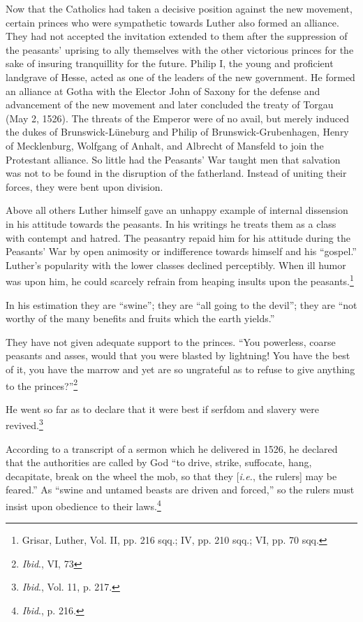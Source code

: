 Now that the Catholics had taken a decisive position against the
new movement, certain princes who were sympathetic towards
Luther also formed an alliance. They had not accepted the invitation
extended to them after the suppression of the peasants’ uprising to
ally themselves with the other victorious princes for the sake of insuring
tranquillity for the future. Philip I, the young and proficient
landgrave of Hesse, acted as one of the leaders of the new government.
He formed an alliance at Gotha with the Elector John of
Saxony for the defense and advancement of the new movement and
later concluded the treaty of Torgau (May 2, 1526). The threats of
the Emperor were of no avail, but merely induced the dukes of
Brunswick-Lüneburg and Philip of Brunswick-Grubenhagen, Henry
of Mecklenburg, Wolfgang of Anhalt, and Albrecht of Mansfeld to
join the Protestant alliance. So little had the Peasants’ War taught
men that salvation was not to be found in the disruption of the
fatherland. Instead of uniting their forces, they were bent upon
division.

Above all others Luther himself gave an unhappy example of internal dissension
in his attitude towards the peasants. In his writings
he treats them as a class with contempt and hatred. The peasantry
repaid him for his attitude during the Peasants’ War by open animosity
or indifference towards himself and his “gospel.” Luther’s
popularity with the lower classes declined perceptibly. When ill humor
was upon him, he could scarcely refrain from heaping insults upon the
peasants.\footnote
{Grisar, Luther, Vol. II, pp. 216 sqq.; IV, pp. 210 sqq.; VI, pp. 70 sqq.}

In his estimation they are “swine”; they are “all going to the devil”; they
are “not worthy of the many benefits and fruits which the earth yields.”

They have not given adequate support to the princes. “You powerless,
coarse peasants and asses, would that you were blasted by lightning! You
have the best of it, you have the marrow and yet are so ungrateful as to
refuse to give anything to the princes?”\footnote{\textit{Ibid}., VI, 73}

He went so far as to declare that it were best if serfdom and slavery were
revived.\footnote{\textit{Ibid}., Vol. 11, p. 217.}

According to a transcript of a sermon which he delivered in 1526, he
declared that the authorities are called by God “to drive, strike, suffocate,
hang, decapitate, break on the wheel the mob, so that they [\textit{i.e.}, the rulers]
may be feared.” As “swine and untamed beasts are driven and forced,” so
the rulers must insist upon obedience to their laws.\footnote{\textit{Ibid}., p. 216.}


